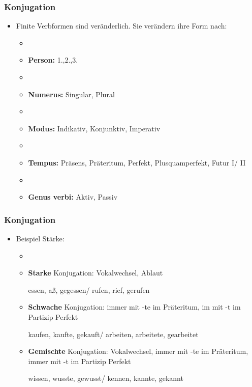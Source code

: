 
\begin{frame}
\frametitle{Konjugation}

\begin{itemize}
	\item Finite Verbformen sind veränderlich. Sie verändern ihre Form nach: 
	
	\begin{itemize}
		\item[]
		\item \textbf{Person:} 1.,2.,3.
		\item[]
		\item \textbf{Numerus:} Singular, Plural
		\item[]
		\item \textbf{Modus:} Indikativ, Konjunktiv, Imperativ
		\item[]
		\item \textbf{Tempus:} Präsens, Präteritum, Perfekt, Plusquamperfekt, Futur I/ II
		\item[]
		\item \textbf{Genus verbi:} Aktiv, Passiv
	\end{itemize}
	
\end{itemize}


\end{frame}




\begin{frame}
\frametitle{Konjugation}

\begin{itemize}
	\item Beispiel Stärke:
	
	\begin{itemize}
		\item[]
		\item \textbf{Starke} Konjugation: Vokalwechsel, Ablaut
		
		\ea essen, aß, gegessen/ rufen, rief, gerufen
		\z
		
		\item \textbf{Schwache} Konjugation: immer mit -te im Präteritum, im mit -t im Partizip Perfekt
		
		\ea kaufen, kaufte, gekauft/ arbeiten, arbeitete, gearbeitet
		\z
		
		\item \textbf{Gemischte} Konjugation: Vokalwechsel, immer mit -te im Präteritum, immer mit -t im Partizip Perfekt
		
		\ea wissen, wusste, gewusst/ kennen, kannte, gekannt
		\z
		
	\end{itemize}
	
\end{itemize}


\end{frame}



